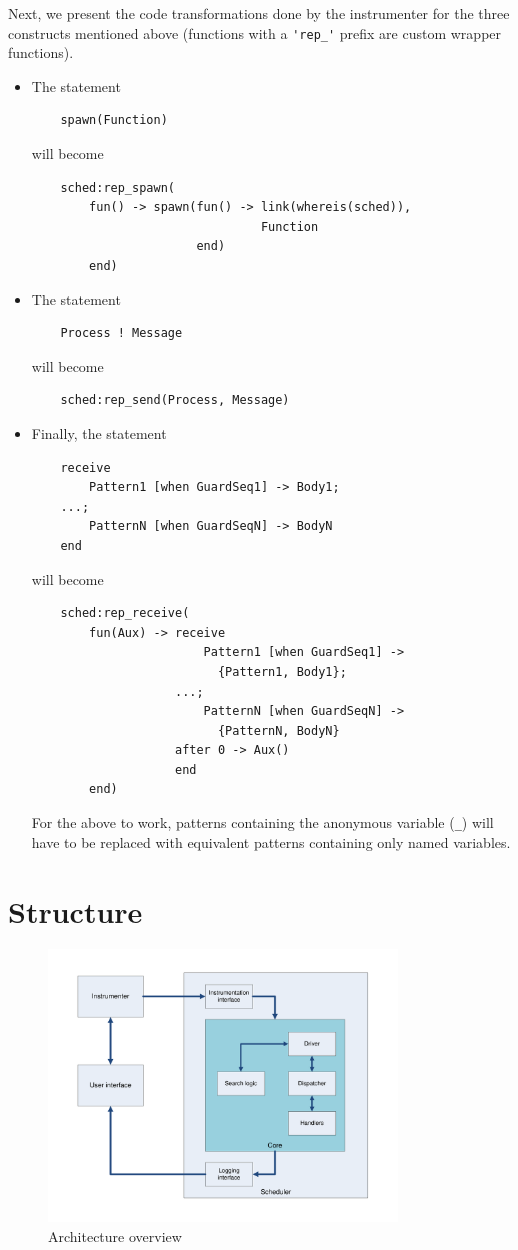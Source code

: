 \documentclass[a4paper,10pt]{article}
\begin{document}
Next, we present the code transformations done by the instrumenter for the three constructs mentioned above
(functions with a \lstinline+'rep_'+ prefix are custom wrapper functions).

\begin{itemize}
	\item The statement
	\begin{lstlisting}
    spawn(Function)
	\end{lstlisting}
	will become
	\begin{lstlisting}
    sched:rep_spawn(
        fun() -> spawn(fun() -> link(whereis(sched)),
                                Function
                       end)
        end)
	\end{lstlisting}
	
	\item The statement
	\begin{lstlisting}
    Process ! Message
	\end{lstlisting}
	will become
	\begin{lstlisting}
    sched:rep_send(Process, Message)
	\end{lstlisting}
	
	\item Finally, the statement
	\begin{lstlisting}
    receive
        Pattern1 [when GuardSeq1] -> Body1;
    ...;
        PatternN [when GuardSeqN] -> BodyN
    end
	\end{lstlisting}
	will become
	\begin{lstlisting}
    sched:rep_receive(
        fun(Aux) -> receive
                        Pattern1 [when GuardSeq1] ->
                          {Pattern1, Body1};
                    ...;
                        PatternN [when GuardSeqN] ->
                          {PatternN, BodyN}
                    after 0 -> Aux()
                    end
        end)
	\end{lstlisting}
	For the above to work, patterns containing the anonymous variable (\lstinline+_+) will have to
	be replaced with equivalent patterns containing only named variables.
\end{itemize}

\section{Structure}

\begin{center}
\begin{figure}[htb]
	\includegraphics[width=350px]{pra1_arch}
	\caption{Architecture overview}
\end{figure}
\end{center}
\end{document}
